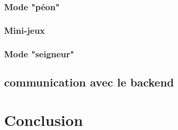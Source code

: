 \documentclass[french,a4paper,10pt]{article}
\begin{document}
        \subsubsection{Mode "péon"}
        \subsubsection{Mini-jeux}
        \subsubsection{Mode "seigneur"}
        
    \subsection{communication avec le backend}

\section{Conclusion}
\end{document}
